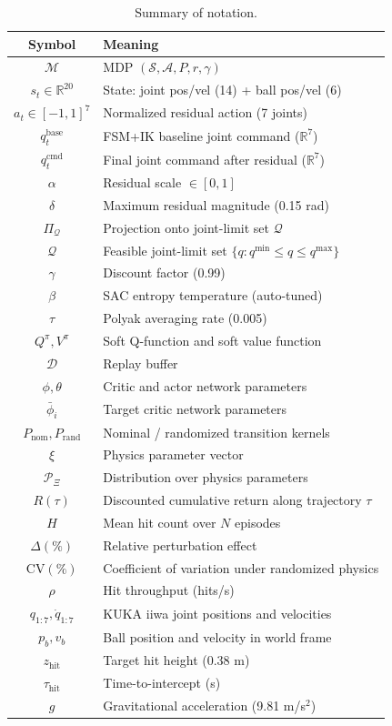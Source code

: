 \documentclass[10pt,twocolumn,letterpaper]{article}
\begin{document}
\begin{table}[h]
\centering
\caption{Summary of notation.}
\label{tab:notation}
\small
\begin{tabular}{cp{5.5cm}}
\toprule
Symbol & Meaning \\
\midrule
$\mathcal{M}$ & MDP $(\mathcal{S},\mathcal{A},P,r,\gamma)$ \\
$s_t \in \mathbb{R}^{20}$ & State: joint pos/vel (14) + ball pos/vel (6) \\
$a_t \in [-1,1]^7$ & Normalized residual action (7 joints) \\
$q_t^{\mathrm{base}}$ & FSM+IK baseline joint command ($\mathbb{R}^7$) \\
$q_t^{\mathrm{cmd}}$ & Final joint command after residual ($\mathbb{R}^7$) \\
$\alpha$ & Residual scale $\in [0,1]$ \\
$\delta$ & Maximum residual magnitude (0.15 rad) \\
$\Pi_{\mathcal{Q}}$ & Projection onto joint-limit set $\mathcal{Q}$ \\
$\mathcal{Q}$ & Feasible joint-limit set $\{q : q^{\min} \le q \le q^{\max}\}$ \\
$\gamma$ & Discount factor (0.99) \\
$\beta$ & SAC entropy temperature (auto-tuned) \\
$\tau$ & Polyak averaging rate (0.005) \\
$Q^\pi, V^\pi$ & Soft Q-function and soft value function \\
$\mathcal{D}$ & Replay buffer \\
$\phi, \theta$ & Critic and actor network parameters \\
$\bar\phi_i$ & Target critic network parameters \\
$P_{\mathrm{nom}}, P_{\mathrm{rand}}$ & Nominal / randomized transition kernels \\
$\xi$ & Physics parameter vector \\
$\mathcal{P}_\Xi$ & Distribution over physics parameters \\
$R(\tau)$ & Discounted cumulative return along trajectory $\tau$ \\
$H$ & Mean hit count over $N$ episodes \\
$\Delta(\%)$ & Relative perturbation effect \\
$\mathrm{CV}(\%)$ & Coefficient of variation under randomized physics \\
$\rho$ & Hit throughput (hits/s) \\
$q_{1:7}, \dot{q}_{1:7}$ & KUKA iiwa joint positions and velocities \\
$p_b, v_b$ & Ball position and velocity in world frame \\
$z_{\mathrm{hit}}$ & Target hit height (0.38 m) \\
$\tau_{\mathrm{hit}}$ & Time-to-intercept (s) \\
$g$ & Gravitational acceleration (9.81 m/s$^2$) \\
\bottomrule
\end{tabular}
\end{table}
\end{document}
